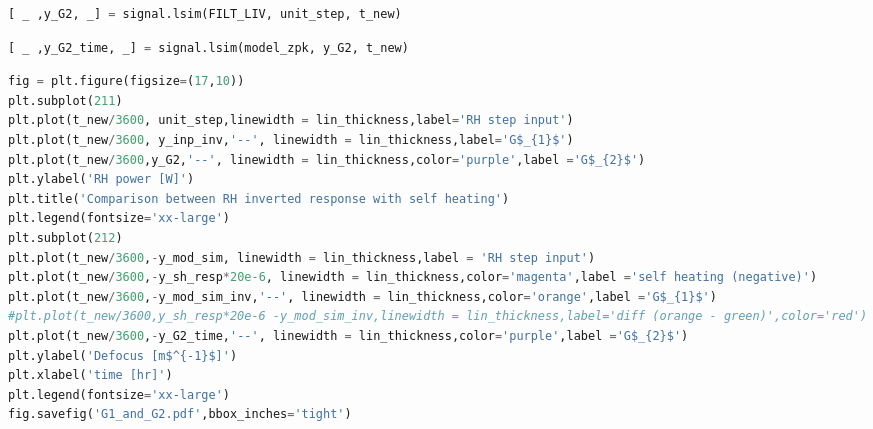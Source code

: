 
\begin{spacing}{1} \begin{lstlisting}[language=Python]
[ _ ,y_G2, _] = signal.lsim(FILT_LIV, unit_step, t_new)
\end{lstlisting} \end{spacing}

\begin{spacing}{1} \begin{lstlisting}[language=Python]
[ _ ,y_G2_time, _] = signal.lsim(model_zpk, y_G2, t_new)
\end{lstlisting} \end{spacing}

\begin{spacing}{1} \begin{lstlisting}[language=Python]
fig = plt.figure(figsize=(17,10))
plt.subplot(211)
plt.plot(t_new/3600, unit_step,linewidth = lin_thickness,label='RH step input')
plt.plot(t_new/3600, y_inp_inv,'--', linewidth = lin_thickness,label='G$_{1}$')
plt.plot(t_new/3600,y_G2,'--', linewidth = lin_thickness,color='purple',label ='G$_{2}$')
plt.ylabel('RH power [W]')
plt.title('Comparison between RH inverted response with self heating')
plt.legend(fontsize='xx-large')
plt.subplot(212)
plt.plot(t_new/3600,-y_mod_sim, linewidth = lin_thickness,label = 'RH step input')
plt.plot(t_new/3600,-y_sh_resp*20e-6, linewidth = lin_thickness,color='magenta',label ='self heating (negative)')
plt.plot(t_new/3600,-y_mod_sim_inv,'--', linewidth = lin_thickness,color='orange',label ='G$_{1}$')
#plt.plot(t_new/3600,y_sh_resp*20e-6 -y_mod_sim_inv,linewidth = lin_thickness,label='diff (orange - green)',color='red')
plt.plot(t_new/3600,-y_G2_time,'--', linewidth = lin_thickness,color='purple',label ='G$_{2}$')
plt.ylabel('Defocus [m$^{-1}$]')
plt.xlabel('time [hr]')
plt.legend(fontsize='xx-large')
fig.savefig('G1_and_G2.pdf',bbox_inches='tight')
\end{lstlisting} \end{spacing}

